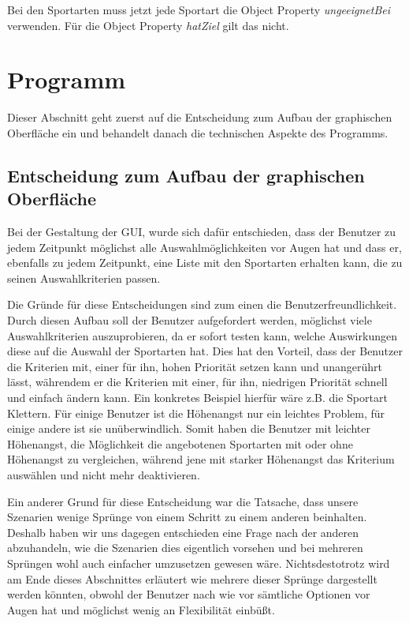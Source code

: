 Bei den Sportarten muss jetzt jede Sportart die Object Property \textit{ungeeignetBei} verwenden. F\"ur die Object Property \textit{hatZiel} gilt das nicht.




\section{Programm}

Dieser Abschnitt geht zuerst auf die Entscheidung zum Aufbau der graphischen Oberfläche ein und behandelt danach die technischen Aspekte des Programms. 

\subsection{Entscheidung zum Aufbau der graphischen Oberfläche}
Bei der Gestaltung der GUI, wurde sich dafür entschieden, dass der Benutzer zu jedem Zeitpunkt möglichst alle Auswahlmöglichkeiten vor Augen hat und dass er, ebenfalls zu jedem Zeitpunkt, eine Liste mit den Sportarten erhalten kann, die zu seinen Auswahlkriterien passen.

Die Gründe für diese Entscheidungen sind zum einen die Benutzerfreundlichkeit. Durch diesen Aufbau soll der Benutzer aufgefordert werden, möglichst viele Auswahlkriterien auszuprobieren, da er sofort testen kann, welche Auswirkungen diese auf die Auswahl der Sportarten hat. Dies hat den Vorteil, dass der Benutzer die Kriterien mit, einer für ihn, hohen Priorität setzen kann und unangerührt lässt, währendem er die Kriterien mit einer, für ihn, niedrigen Priorität schnell und einfach ändern kann. Ein konkretes Beispiel hierfür wäre z.B. die Sportart Klettern. Für einige Benutzer ist die Höhenangst nur ein leichtes Problem, für einige andere ist sie unüberwindlich. Somit haben die Benutzer mit leichter Höhenangst, die Möglichkeit die angebotenen Sportarten mit oder ohne Höhenangst zu vergleichen, während jene mit starker Höhenangst das Kriterium auswählen und nicht mehr deaktivieren.

Ein anderer Grund für diese Entscheidung war die Tatsache, dass unsere Szenarien wenige Sprünge von einem Schritt zu einem anderen beinhalten. Deshalb haben wir uns dagegen entschieden eine Frage nach der anderen abzuhandeln, wie die Szenarien dies eigentlich vorsehen und bei mehreren Sprüngen wohl auch einfacher umzusetzen gewesen wäre. Nichtsdestotrotz wird am Ende dieses Abschnittes erläutert wie mehrere dieser Sprünge dargestellt werden könnten, obwohl der Benutzer nach wie vor sämtliche Optionen vor Augen hat und möglichst wenig an Flexibilität einbüßt.

